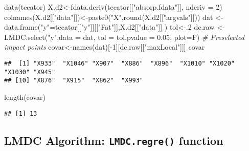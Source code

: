 \documentclass[
]{book}
\newenvironment{Shaded}{\begin{snugshade}}{\end{snugshade}}
\newcommand{\AttributeTok}[1]{\textcolor[rgb]{0.77,0.63,0.00}{#1}}
\newcommand{\CommentTok}[1]{\textcolor[rgb]{0.56,0.35,0.01}{\textit{#1}}}
\newcommand{\DecValTok}[1]{\textcolor[rgb]{0.00,0.00,0.81}{#1}}
\newcommand{\FloatTok}[1]{\textcolor[rgb]{0.00,0.00,0.81}{#1}}
\newcommand{\FunctionTok}[1]{\textcolor[rgb]{0.00,0.00,0.00}{#1}}
\newcommand{\NormalTok}[1]{#1}
\newcommand{\OtherTok}[1]{\textcolor[rgb]{0.56,0.35,0.01}{#1}}
\newcommand{\SpecialCharTok}[1]{\textcolor[rgb]{0.00,0.00,0.00}{#1}}
\newcommand{\StringTok}[1]{\textcolor[rgb]{0.31,0.60,0.02}{#1}}
\begin{document}
\begin{Shaded}
\begin{Highlighting}[]
\FunctionTok{data}\NormalTok{(tecator)}
\NormalTok{X.d2}\OtherTok{\textless{}{-}}\FunctionTok{fdata.deriv}\NormalTok{(tecator[[}\StringTok{"absorp.fdata"}\NormalTok{]],}
\AttributeTok{nderiv =} \DecValTok{2}\NormalTok{)}
\FunctionTok{colnames}\NormalTok{(X.d2[[}\StringTok{"data"}\NormalTok{]])}\OtherTok{\textless{}{-}}\FunctionTok{paste0}\NormalTok{(}\StringTok{"X"}\NormalTok{,}\FunctionTok{round}\NormalTok{(X.d2[[}\StringTok{"argvals"}\NormalTok{]]))}
\NormalTok{dat }\OtherTok{\textless{}{-}} \FunctionTok{data.frame}\NormalTok{(}\StringTok{"y"}\OtherTok{=}\NormalTok{tecator[[}\StringTok{"y"}\NormalTok{]][[}\StringTok{"Fat"}\NormalTok{]],X.d2[[}\StringTok{"data"}\NormalTok{]] )}
\NormalTok{tol}\OtherTok{\textless{}{-}}\NormalTok{.}\DecValTok{2}
\NormalTok{dc.raw }\OtherTok{\textless{}{-}} \FunctionTok{LMDC.select}\NormalTok{(}\StringTok{"y"}\NormalTok{,}\AttributeTok{data =}\NormalTok{ dat, }\AttributeTok{tol =}\NormalTok{ tol,}\AttributeTok{pvalue =} \FloatTok{0.05}\NormalTok{,}
\AttributeTok{plot=}\NormalTok{F)}
\CommentTok{\# Preselected impact points }
\NormalTok{covar}\OtherTok{\textless{}{-}}\FunctionTok{names}\NormalTok{(dat)[}\SpecialCharTok{{-}}\DecValTok{1}\NormalTok{][dc.raw[[}\StringTok{"maxLocal"}\NormalTok{]]]}
\NormalTok{covar}
\end{Highlighting}
\end{Shaded}

\begin{verbatim}
##  [1] "X933"  "X1046" "X907"  "X886"  "X896"  "X1010" "X1020" "X1030" "X945" 
## [10] "X876"  "X915"  "X862"  "X993"
\end{verbatim}

\begin{Shaded}
\begin{Highlighting}[]
\FunctionTok{length}\NormalTok{(covar)}
\end{Highlighting}
\end{Shaded}

\begin{verbatim}
## [1] 13
\end{verbatim}

\hypertarget{lmdc-algorithm-lmdc.regre-function}{%
\subsection{\texorpdfstring{LMDC Algorithm: \texttt{LMDC.regre()} function}{LMDC Algorithm: LMDC.regre() function}}\label{lmdc-algorithm-lmdc.regre-function}}
\end{document}
